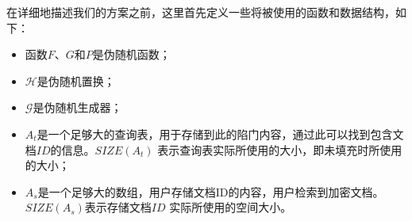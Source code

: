 
在详细地描述我们的方案之前，这里首先定义一些将被使用的函数和数据结构，如下：
\begin{itemize}
  \item
  函数$F$、$G$和$P$是伪随机函数；

  \item
  $\mathcal{H}$是伪随机置换；

  \item
  $\mathcal{G}$是伪随机生成器；

  \item
  $A_t$是一个足够大的查询表，用于存储到此的陷门内容，通过此可以找到包含文档$ID$的信息。$SIZE(A_t)$ 表示查询表实际所使用的大小，即未填充时所使用的大小；

  \item
  $A_s$是一个足够大的数组，用户存储文档ID的内容，用户检索到加密文档。$SIZE(A_s)$表示存储文档$ID$ 实际所使用的空间大小。
\end{itemize}

